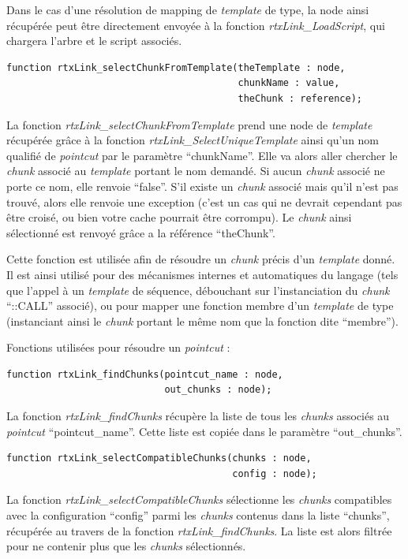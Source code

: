 \documentclass[french]{rtxreport}
\begin{document}
Dans le cas d'une résolution de mapping de \emph{template} de type, la node ainsi
récupérée peut être directement envoyée à la fonction
\emph{rtxLink\_LoadScript}, qui chargera l'arbre et le script associés.

\begin{lstlisting}
function rtxLink_selectChunkFromTemplate(theTemplate : node,
                                         chunkName : value,
                                         theChunk : reference);
\end{lstlisting}
La fonction \emph{rtxLink\_selectChunkFromTemplate} prend une node de
\emph{template} récupérée grâce à la fonction
\emph{rtxLink\_SelectUniqueTemplate} ainsi qu'un nom qualifié de
\emph{pointcut} par le paramètre ``chunkName''. Elle va alors aller chercher le
\emph{chunk} associé au \emph{template} portant le nom demandé. Si aucun
\emph{chunk} associé ne porte ce nom, elle renvoie ``false''. S'il existe un
\emph{chunk} associé mais qu'il n'est pas trouvé, alors elle renvoie une
exception (c'est un cas qui ne devrait cependant pas être croisé, ou bien votre
cache pourrait être corrompu). Le \emph{chunk} ainsi sélectionné est renvoyé
grâce a la référence ``theChunk''.

Cette fonction est utilisée afin de résoudre un \emph{chunk} précis d'un
\emph{template} donné. Il est ainsi utilisé pour des mécanismes internes et
automatiques du langage (tels que l'appel à un \emph{template} de séquence,
débouchant sur l'instanciation du \emph{chunk} ``::CALL'' associé), ou pour
mapper une fonction membre d'un \emph{template} de type (instanciant ainsi le
\emph{chunk} portant le même nom que la fonction dite ``membre'').

\vspace{20pt}

Fonctions utilisées pour résoudre un \emph{pointcut} :
\begin{lstlisting}
function rtxLink_findChunks(pointcut_name : node,
                            out_chunks : node);
\end{lstlisting}
La fonction \emph{rtxLink\_findChunks} récupère la liste de tous les
\emph{chunks} associés au \emph{pointcut} ``pointcut\_name''. Cette liste est
copiée dans le paramètre ``out\_chunks''.


\begin{lstlisting}
function rtxLink_selectCompatibleChunks(chunks : node,
                                        config : node);
\end{lstlisting}
La fonction \emph{rtxLink\_selectCompatibleChunks} sélectionne les
\emph{chunks} compatibles avec la configuration ``config'' parmi les
\emph{chunks} contenus dans la liste ``chunks'', récupérée au travers de la
fonction \emph{rtxLink\_findChunks}. La liste est alors filtrée pour ne
contenir plus que les \emph{chunks} sélectionnés.
\end{document}
